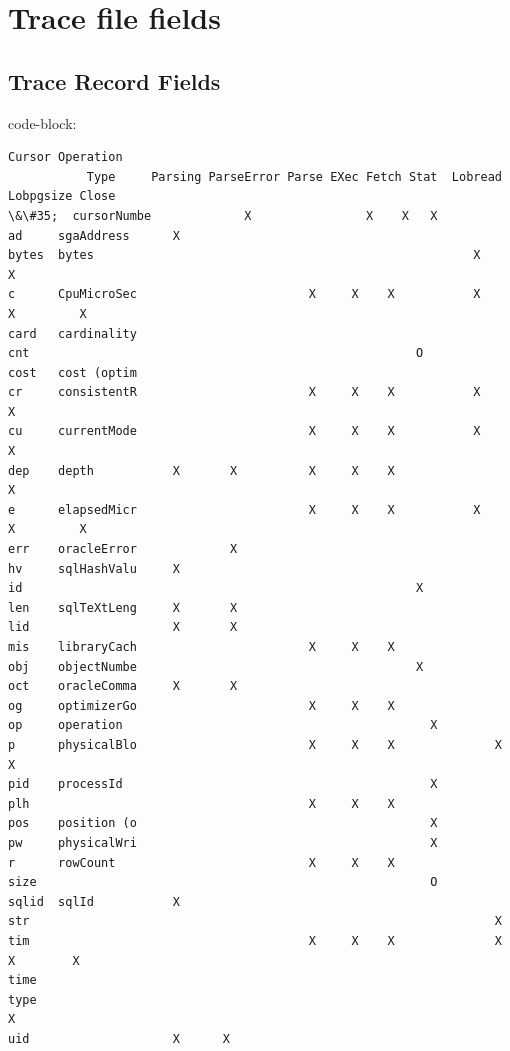 \documentclass[letterpaper,10pt,english]{sphinxmanual}
\begin{document}
\chapter{Trace file fields}
\label{index:trace-file-fields}

\section{Trace Record Fields}
\label{traceRecordFields:trace-record-fields}\label{traceRecordFields::doc}
code-block:

\begin{Verbatim}[commandchars=\\\{\}]
                                       Cursor Operation
           Type     Parsing ParseError Parse EXec Fetch Stat  Lobread Lobpgsize Close
\&\#35;  cursorNumbe             X                X    X   X
ad     sgaAddress      X
bytes  bytes                                                     X      X
c      CpuMicroSec                        X     X    X           X      X         X
card   cardinality
cnt                                                      O
cost   cost (optim
cr     consistentR                        X     X    X           X      X
cu     currentMode                        X     X    X           X      X
dep    depth           X       X          X     X    X                            X
e      elapsedMicr                        X     X    X           X      X         X
err    oracleError             X
hv     sqlHashValu     X
id                                                       X
len    sqlTeXtLeng     X       X
lid                    X       X
mis    libraryCach                        X     X    X
obj    objectNumbe                                       X
oct    oracleComma     X       X
og     optimizerGo                        X     X    X
op     operation                                           X
p      physicalBlo                        X     X    X              X       X
pid    processId                                           X
plh                                       X     X    X
pos    position (o                                         X
pw     physicalWri                                         X
r      rowCount                           X     X    X
size                                                       O
sqlid  sqlId           X
str                                                                 X
tim                                       X     X    X              X       X        X
time
type                                                                                                          X
uid                    X      X
\end{Verbatim}
\end{document}
